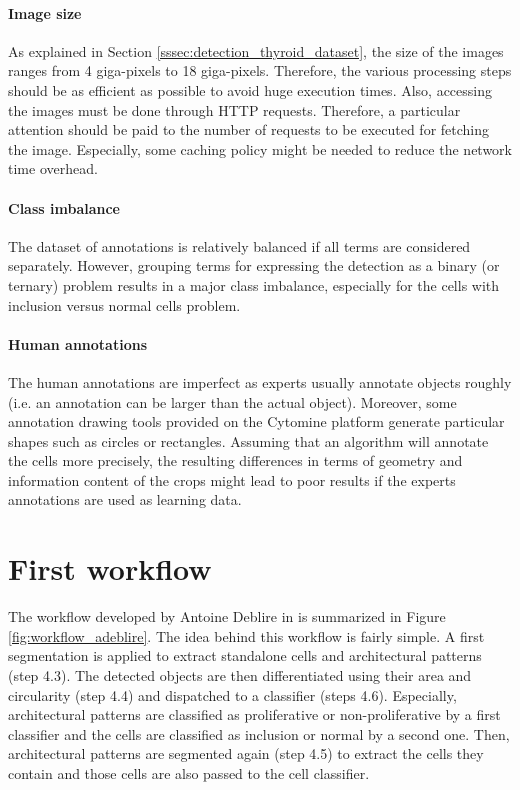 \paragraph{Image size} As explained in Section \ref{sssec:detection_thyroid_dataset}, the size of the images ranges from 4 giga-pixels to 18 giga-pixels. Therefore, the various processing steps should be as efficient as possible to avoid huge execution times. Also, accessing the images must be done through HTTP requests. Therefore, a particular attention should be paid to the number of requests to be executed for fetching the image. Especially, some caching policy might be needed to reduce the network time overhead. 

\paragraph{Class imbalance} The dataset of annotations is relatively balanced if all terms are considered separately. However, grouping terms for expressing the detection as a binary (or ternary) problem results in a major class imbalance, especially for the cells with inclusion versus normal cells problem. 

\paragraph{Human annotations} The human annotations are imperfect as experts usually annotate objects roughly (i.e. an annotation can be larger than the actual object). Moreover, some annotation drawing tools provided on the Cytomine platform generate particular shapes such as circles or rectangles. Assuming that an algorithm will annotate the cells more precisely, the resulting  differences in terms of geometry and information content of the crops might lead to poor results if the experts annotations are used as learning data. 


\section{First workflow}
\label{sec:thyroid_adeblire_algo}

The workflow developed by Antoine Deblire in \cite{adeblire2013} is summarized in Figure \ref{fig:workflow_adeblire}. The idea behind this workflow is fairly simple. A first segmentation is applied to extract standalone cells and architectural patterns (step 4.3). The detected objects are then differentiated using their area and circularity (step 4.4) and dispatched to a classifier (steps 4.6). Especially, architectural patterns are classified as proliferative or non-proliferative by a first classifier and the cells are classified as inclusion or normal by a second one. Then, architectural patterns are segmented again (step 4.5) to extract the cells they contain and those cells are also passed to the cell classifier. 

